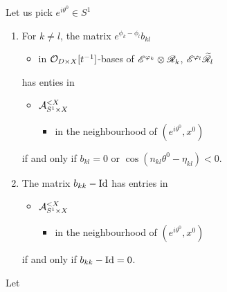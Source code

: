\begin{lem}
  Let us pick $e^{i\theta^0}\in S^1$
  \begin{enumerate}
    \item For $k\neq l$, the matrix $e^{\phi_k-\phi_l}b_{kl}$
      \begin{itemize}
        \item in $\mathcal{O}_{D\times X}[t^{-1}]$-bases of $\mathscr{E}^{\varphi_k}\otimes\mathscr{R}_k$,
          $\mathscr{E}^{\varphi_l}\widetilde{\mathscr{R}}_l$
      \end{itemize}
      has enties in
      \begin{itemize}
        \item $\mathcal{A}_{S^1\times X}^{<X}$
          \begin{itemize}
            \item in the neighbourhood of $(e^{i\theta^0},x^0)$
          \end{itemize}
      \end{itemize}
      if and only if $b_{kl}=0$ or
      $\cos(n_{kl}\theta^0-\eta_{kl})<0$.
    \item The matrix $b_{kk}-\operatorname{Id}$ has entries in
      \begin{itemize}
        \item $\mathcal{A}_{S^1\times X}^{<X}$
          \begin{itemize}
            \item in the neighbourhood of $(e^{i\theta^0},x^0)$
          \end{itemize}
      \end{itemize}
      if and only if $b_{kk}-\operatorname{Id}=0$.
  \end{enumerate}
  \begin{comment}
    \begin{proof}[Proofsketch]
      For the first point, it is enough to check that $e^{\phi_k-\phi_l}$
      belongs to $\cA_{S^1\times X}^{<X}$ in the neighbourhood of
      $(e^{i\theta^0},x^0)$ if and only if $\Re(\phi_k-\phi_l)<0$ on a
      sufficiently small neighbourhood of $(e^{i\theta^0},x^0)$, then to
      express this condition on the leading term of $\phi_k-\phi_l$.  Then, one
      notices that, as $b_{kl}$ has moderate growth, it does not affect the
      rapid decay or the exponential growth property.
    \end{proof}
  \end{comment}
\end{lem}
Let
